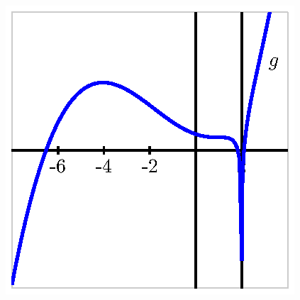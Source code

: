 \begin{activitySolution}
\begin{center}
  	\includegraphics{figures/3_1_Act1Soln.eps}
  \end{center}
\ea
\end{activitySolution}
\aftera